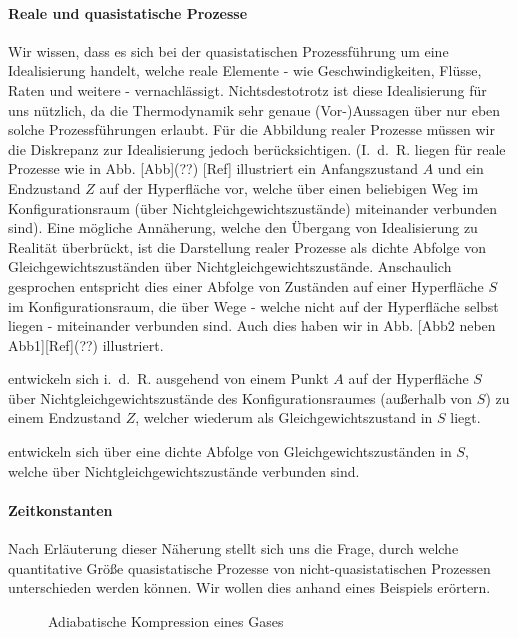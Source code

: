 \paragraph*{Reale und quasistatische Prozesse}
Wir wissen, dass es sich bei der quasistatischen Prozessführung um eine Idealisierung handelt, welche reale Elemente - wie Geschwindigkeiten, Flüsse, Raten und weitere - vernachlässigt. 
Nichtsdestotrotz ist diese Idealisierung für uns nützlich, da die Thermodynamik sehr genaue (Vor-)Aussagen über nur eben solche Prozessführungen erlaubt.
Für die Abbildung realer Prozesse müssen wir die Diskrepanz zur Idealisierung jedoch berücksichtigen. (I.~d.~R. liegen für reale Prozesse wie in Abb. [Abb](??) [Ref] illustriert ein Anfangszustand $A$ und ein Endzustand $Z$ auf der Hyperfläche vor, welche über einen beliebigen Weg im Konfigurationsraum (über Nichtgleichgewichtszustände) miteinander verbunden sind).  
Eine mögliche Annäherung, welche den Übergang von Idealisierung zu Realität überbrückt, ist die Darstellung realer Prozesse als dichte Abfolge von Gleichgewichtszuständen über Nichtgleichgewichtszustände. Anschaulich gesprochen entspricht dies einer Abfolge von Zuständen auf einer Hyperfläche $S$ im Konfigurationsraum, die über Wege - welche nicht auf der Hyperfläche selbst liegen - miteinander verbunden sind. Auch dies haben wir in Abb. [Abb2 neben Abb1][Ref](??) illustriert.    
\begin{formal}
      entwickeln sich i.~d.~R. ausgehend von einem Punkt $A$ auf der Hyperfläche $S$ über Nichtgleichgewichtszustände des Konfigurationsraumes (außerhalb von $S$) zu einem Endzustand $Z$, welcher wiederum als Gleichgewichtszustand in $S$ liegt.

      entwickeln sich über eine dichte Abfolge von Gleichgewichtszuständen in $S$, welche über Nichtgleichgewichtszustände verbunden sind.
 \end{formal}

\paragraph*{Zeitkonstanten}
Nach Erläuterung dieser Näherung stellt sich uns die Frage, durch welche quantitative Größe quasistatische Prozesse von nicht-quasistatischen Prozessen unterschieden werden können.
Wir wollen dies anhand eines Beispiels erörtern.

\begin{figure}[htbp]
    \centering
    \tfigAdiabaticGasCompression
    \caption{Adiabatische Kompression eines Gases}
    \label{fig:AdiabaticGasCompression}
\end{figure}

